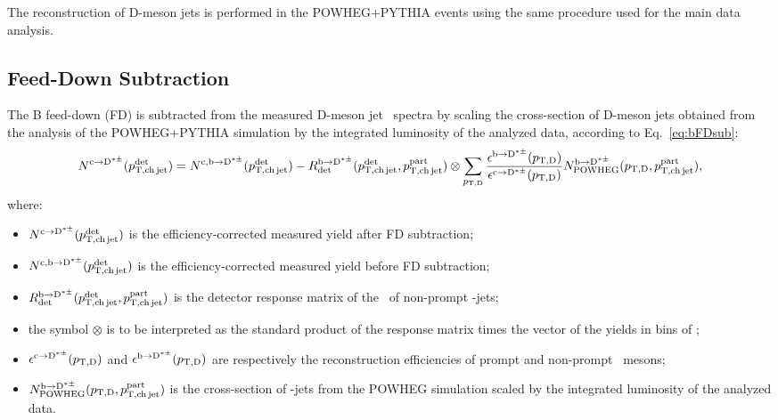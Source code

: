 The reconstruction of D-meson jets is performed in the POWHEG+PYTHIA events using the same procedure used for the main data analysis.


\subsection{Feed-Down Subtraction}
The B feed-down (FD) is subtracted from the measured D-meson jet \pt\ spectra by scaling the cross-section of D-meson jets obtained from the analysis of the POWHEG+PYTHIA simulation by the integrated luminosity of the analyzed data, according to Eq.~\ref{eq:bFDsub}:
\begin{equation}
N^{\rm c\rightarrow\mathrm{D^{*\pm}}}(p_{\mathrm{T,ch\,jet}}^{\mathrm{det}}) = 
N^{\rm c,b\rightarrow\mathrm{D^{*\pm}}}(p_{\mathrm{T,ch\,jet}}^{\mathrm{det}}) - 
R_{\rm det}^{\rm b\rightarrow\mathrm{D^{*\pm}}}(p_{\mathrm{T,ch\,jet}}^{\mathrm{det}},p_{\mathrm{T,ch\,jet}}^{\mathrm{part}}) \otimes \sum_{p_{\mathrm{T,D}}} \frac{\epsilon^{\rm b\rightarrow\mathrm{D^{*\pm}}}(p_{\mathrm{T,D}})}{\epsilon^{\rm c\rightarrow\mathrm{D^{*\pm}}}(p_{\mathrm{T,D}})} N^{\rm b\rightarrow\mathrm{D^{*\pm}}}_{\rm POWHEG}(p_{\mathrm{T,D}},p_{\mathrm{T,ch\,jet}}^{\mathrm{part}}),
\label{eq:bFDsub}
\end{equation}
where:
\begin{itemize}
\item $N^{\rm c\rightarrow\mathrm{D^{*\pm}}}(p_{\mathrm{T,ch\,jet}}^{\mathrm{det}})$ is the efficiency-corrected measured yield after FD subtraction; 
\item $N^{\rm c,b\rightarrow\mathrm{D^{*\pm}}}(p_{\mathrm{T,ch\,jet}}^{\mathrm{det}})$ is the efficiency-corrected measured yield before FD subtraction;
\item $R_{\rm det}^{\rm b\rightarrow\mathrm{D^{*\pm}}}(p_{\mathrm{T,ch\,jet}}^{\mathrm{det}},p_{\mathrm{T,ch\,jet}}^{\mathrm{part}})$ is the detector response matrix of the \pt\ of non-prompt \Dstar-jets;
\item the symbol $\otimes$ is to be interpreted as the standard product of the response matrix times the vector of the yields in bins of \ptchjetgen;
\item $\epsilon^{\rm c\rightarrow\mathrm{D^{*\pm}}}(p_{\mathrm{T,D}})$ and $\epsilon^{\rm b\rightarrow\mathrm{D^{*\pm}}}(p_{\mathrm{T,D}})$ are respectively the reconstruction efficiencies of prompt and non-prompt \Dstar\ mesons;
\item $N^{\rm b\rightarrow\mathrm{D^{*\pm}}}_{\rm POWHEG}(p_{\mathrm{T,D}},p_{\mathrm{T,ch\,jet}}^{\mathrm{part}})$ is the cross-section of \Dstar-jets from the POWHEG simulation scaled by the integrated luminosity of the analyzed data.
\end{itemize}


